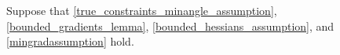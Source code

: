 Suppose that \cref{true_constraints_minangle_assumption}, \cref{bounded_gradients_lemma}, \cref{bounded_hessians_assumption}, and \cref{mingradassumption} hold.
